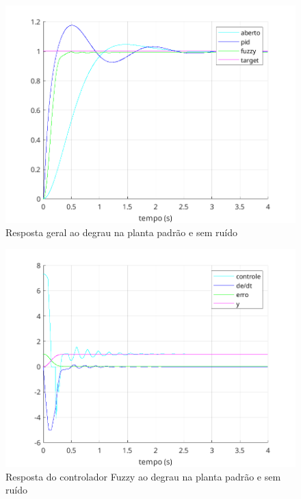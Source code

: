 \documentclass[12pt]{article}
\begin{document}




\begin{figure}
    \centering
    \includegraphics{fig/step_puro.png}
    \caption{Resposta geral ao degrau na planta padrão e sem ruído}
\end{figure}

\begin{figure}
    \centering
    \includegraphics{fig/step_puro_fuzzy.png}
    \caption{Resposta do controlador Fuzzy ao degrau na planta padrão e sem ruído}
\end{figure}
\end{document}
